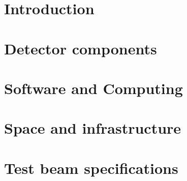 \ifdefined\isfinal\documentclass[final]{pd-tdr}\else\documentclass{pd-tdr}\fi
\begin{document}



\chapter{Introduction}


\chapter{Detector components} 


\chapter{Software and Computing}


\chapter{Space and infrastructure}


\chapter{Test beam specifications} 


%

\cleardoublepage


\end{document}
